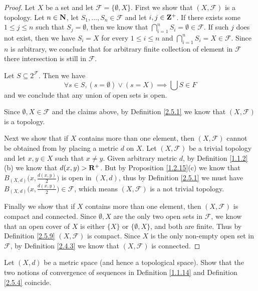 \begin{proof}
    Let \(X\) be a set and let \(\mathcal{F} = \{\emptyset, X\}\).
    First we show that \((X, \mathcal{F})\) is a topology.
    Let \(n \in \mathbf{N}\), let \(S_1, \dots, S_n \in \mathcal{F}\) and let \(i, j \in \mathbf{Z}^+\).
    If there exists some \(1 \leq j \leq n\) such that \(S_j = \emptyset\), then we know that \(\bigcap_{i = 1}^n S_i = \emptyset \in \mathcal{F}\).
    If such \(j\) does not exist, then we have \(S_i = X\) for every \(1 \leq i \leq n\) and \(\bigcap_{i = 1}^n S_i = X \in \mathcal{F}\).
    Since \(n\) is arbitrary, we conclude that for arbitrary finite collection of element in \(\mathcal{F}\) there intersection is still in \(\mathcal{F}\).

    Let \(S \subseteq 2^{\mathcal{F}}\).
    Then we have
    \[
        \forall s \in S, (s = \emptyset) \lor (s = X) \implies \bigcup S \in F
    \]
    and we conclude that any union of open sets is open.

    Since \(\emptyset, X \in \mathcal{F}\) and the claims above, by Definition \ref{2.5.1} we know that \((X, \mathcal{F})\) is a topology.

    Next we show that if \(X\) contains more than one element, then \((X, \mathcal{F})\) cannot be obtained from by placing a metric \(d\) on \(X\).
    Let \((X, \mathcal{F})\) be a trivial topology and let \(x, y \in X\) such that \(x \neq y\).
    Given arbitrary metric \(d\), by Definition \ref{1.1.2}(b) we know that \(d(x, y) > \mathbf{R}^+\).
    But by Proposition \ref{1.2.15}(c) we know that \(B_{(X, d)}\big(x, \frac{d(x, y)}{2}\big)\) is open in \((X, d)\), thus by Definition \ref{2.5.1} we must have \(B_{(X, d)}\big(x, \frac{d(x, y)}{2}\big) \in \mathcal{F}\), which means \((X, \mathcal{F})\) is a not trivial topology.

    Finally we show that if \(X\) contains more than one element, then \((X, \mathcal{F})\) is compact and connected.
    Since \(\emptyset, X\) are the only two open sets in \(\mathcal{F}\), we know that an open cover of \(X\) is either \(\{X\}\) or \(\{\emptyset, X\}\), and both are finite.
    Thus by Definition \ref{2.5.9} \((X, \mathcal{F})\) is compact.
    Since \(X\) is the only non-empty open set in \(\mathcal{F}\), by Definition \ref{2.4.3} we know that \((X, \mathcal{F})\) is connected.
\end{proof}

\begin{exercise}\label{ex 2.5.2}
    Let \((X, d)\) be a metric space
    (and hence a topological space).
    Show that the two notions of convergence of sequences in Definition \ref{1.1.14} and Definition \ref{2.5.4} coincide.
\end{exercise}

